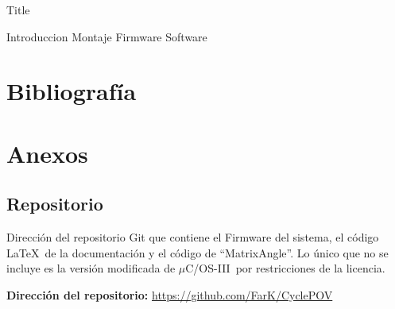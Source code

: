 \documentclass[a4paper,12pt]{article}
\def\uCOS{$\mu$C/OS-III}
\begin{document}
{Title}

\tableofcontents
\newpage

{Introduccion}
\newpage
{Montaje}
\newpage
{Firmware}
\newpage
{Software}
\newpage

\section{Bibliografía}
\nocite{*}



\newpage
\section{Anexos}
\subsection{Repositorio}
Dirección del repositorio Git que contiene el Firmware del sistema, el código
\LaTeX\ de la documentación y el código de ``MatrixAngle''. Lo único que no se
incluye es la versión modificada de \uCOS\ por restricciones de la licencia.

\textbf{Dirección del repositorio:} \url{https://github.com/FarK/CyclePOV}
\end{document}
